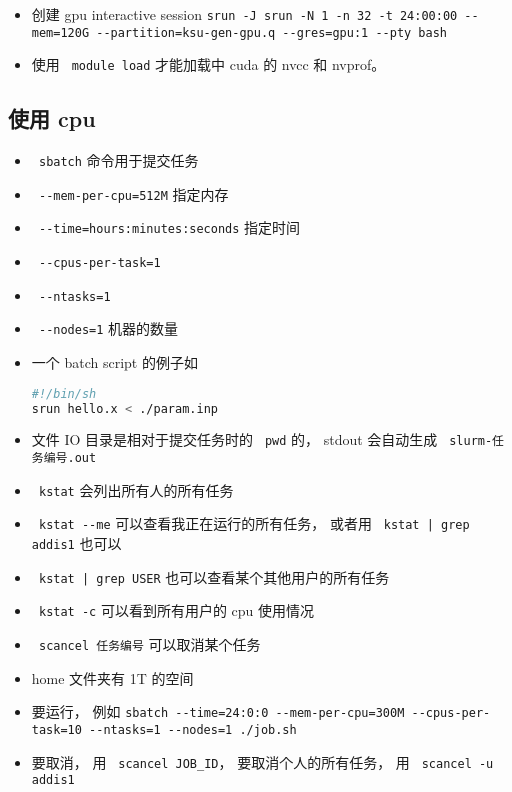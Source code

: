 
\begin{issues}
\issueDraft
\end{issues}

\begin{itemize}
\item 创建 gpu interactive session \verb|srun -J srun -N 1 -n 32 -t 24:00:00 --mem=120G --partition=ksu-gen-gpu.q --gres=gpu:1 --pty bash|
\item 使用 \verb` module load` 才能加载中 cuda 的 nvcc 和 nvprof。
\end{itemize}

\subsection{使用 cpu}
\begin{itemize}
\item \verb` sbatch` 命令用于提交任务
\item \verb` --mem-per-cpu=512M` 指定内存
\item \verb` --time=hours:minutes:seconds` 指定时间
\item \verb` --cpus-per-task=1`
\item \verb` --ntasks=1`
\item \verb` --nodes=1` 机器的数量
\item 一个 batch script 的例子如
\begin{lstlisting}[language=bash]
#!/bin/sh
srun hello.x < ./param.inp
\end{lstlisting}
\item 文件 IO 目录是相对于提交任务时的 \verb` pwd` 的， stdout 会自动生成 \verb` slurm-任务编号.out`
\item \verb` kstat` 会列出所有人的所有任务
\item \verb` kstat --me` 可以查看我正在运行的所有任务， 或者用 \verb` kstat | grep addis1` 也可以
\item \verb` kstat | grep USER` 也可以查看某个其他用户的所有任务
\item \verb` kstat -c` 可以看到所有用户的 cpu 使用情况
\item \verb` scancel 任务编号` 可以取消某个任务
\item home 文件夹有 1T 的空间
\item 要运行， 例如
\verb|sbatch --time=24:0:0 --mem-per-cpu=300M --cpus-per-task=10 --ntasks=1 --nodes=1 ./job.sh|
\item 要取消， 用 \verb` scancel JOB_ID`， 要取消个人的所有任务， 用 \verb` scancel -u addis1`
\end{itemize}
